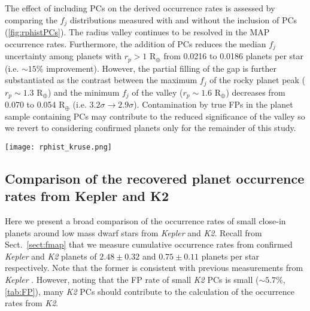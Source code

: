 \documentclass[twocolumn]{emulateapj}
\newcommand{\kepler}[1]{\emph{Kepler}#1}
\newcommand{\ktwo}[1]{\emph{K2}#1}
\begin{document}


The effect of including PCs on the derived occurrence rates is assessed by comparing the $f_j$ distributions
measured with and without the inclusion of PCs (\autoref{fig:rphistPCs}). The radius valley continues to be resolved in
the MAP occurrence rates. Furthermore, the addition of PCs reduces the median $f_j$ uncertainty among planets
with $r_p>1$ R$_{\oplus}$ from
0.0216 to 0.0186 planets per star (i.e. $\sim 15$\% improvement). However, the partial filling of the gap is
further substantiated as the contrast between the maximum $f_j$ of the rocky planet peak ($r_p \sim 1.3$ R$_{\oplus}$)
and the minimum $f_j$ of the valley ($r_p \sim 1.6$ R$_{\oplus}$) decreases from 0.070
to 0.054 R$_{\oplus}$ (i.e. $3.2\sigma \to 2.9\sigma$). Contamination by true FPs in the planet sample containing
PCs may contribute to the reduced significance of the valley so we revert to considering confirmed planets only
for the remainder of this study. 


\begin{figure*}
  \centering
  \texttt{[image: rphist\_kruse.png]}
  \caption{Comparison of occurrence rates with and without planet candidates included. \emph{Left panel}:
    same as \autoref{fig:rphist}. \emph{Right panel}: histogram depicting the relative occurrence
    rate of close-in planets with orbital periods $<100$ days derived from the population of confirmed
    planets from \kepler{} and \ktwo{} and supplemented by 119 randomly selected PCs
    around low mass stars from \cite{kruse19}. The radius valley continues to be resolved with
    the inclusion of PCs improving the median uncertainty on the occurrence rate bins although the
    bimodality becomes less prominent with numerous PCs partially filling the valley.}
  \label{fig:rphistPCs}
\end{figure*}


\subsection{Comparison of the recovered planet occurrence rates from Kepler and K2} \label{sect:comparef}
Here we present a broad comparison of the occurrence rates of small close-in planets around
low mass dwarf stars from \kepler{} and \ktwo{.} Recall from Sect.~\ref{sect:fmap} that
we measure cumulative occurrence rates from confirmed \kepler{} and \ktwo{} planets of 
$2.48\pm 0.32$ and $0.75\pm 0.11$ planets per star respectively. Note that the former is consistent with
previous measurements from \kepler{} \citep{morton14,dressing15a,gaidos16}. However, noting that 
the FP rate of small \ktwo{} PCs is small ($\sim 5.7$\%, \autoref{tab:FP}), many \ktwo{} PCs should contribute
to the calculation of the occurrence rates from \ktwo{.}
\end{document}
